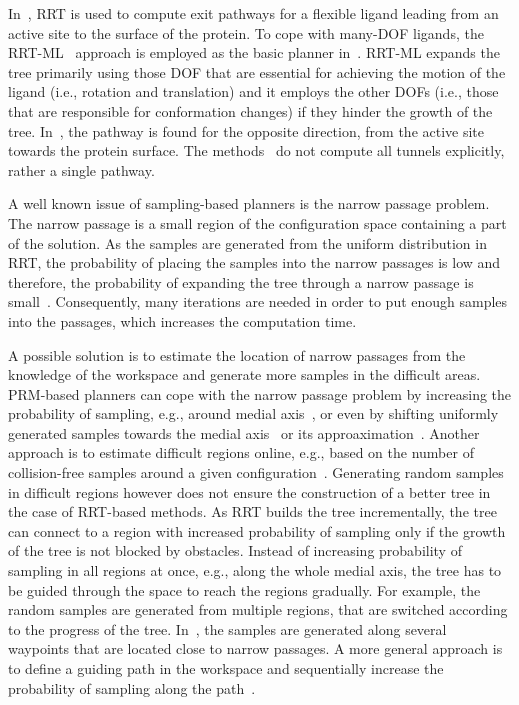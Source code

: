 \documentclass[usletter, 10pt, conference]{svjour3}      %
\begin{document}
In~\cite{guieysse2008structure,cortes2010simulating}, RRT is used to compute exit pathways for a flexible ligand leading from an active site to the surface of the protein.
To cope with many-DOF ligands, the RRT-ML~\cite{cortes2007mlrrt} approach is employed as the basic planner in~\cite{cortes2010simulating}.
RRT-ML expands the tree primarily using those DOF that are essential for achieving the motion of the ligand (i.e., rotation
and translation) and it employs the other DOFs (i.e., those that are responsible for conformation changes) if they hinder the growth of the tree.
In~\cite{cortesMD}, the pathway is found for the opposite direction, from the active site towards the protein surface.
The methods~\cite{guieysse2008structure,cortesMD} do not compute all tunnels explicitly, rather a single pathway.

A well known issue of sampling-based planners is the narrow passage problem.
The narrow passage is a small region of the configuration space containing a part of the solution.
As the samples are generated from the uniform distribution in RRT, the probability of placing the samples into the narrow passages is low and therefore, the probability of expanding the tree through a narrow passage is small~\cite{hannaWIS}.
Consequently, many iterations are needed in order to put enough samples into the passages, which increases the computation time.

A possible solution is to estimate the location of narrow passages from the knowledge of the workspace and generate more samples
in the difficult areas.
PRM-based planners can cope with the narrow passage problem by increasing the probability of sampling, e.g., around medial axis~\cite{amatoOBRRT,amato2002using,wilmarthMAPRM}, or even by shifting uniformly generated samples towards the medial axis~\cite{amatoOBPRM} or its approaximation~\cite{hollemanMAPRM}.
Another approach is to estimate difficult regions online, e.g., based on the number of collision-free samples around a given configuration~\cite{overmarsGauss,hsuBridge}.
Generating random samples in difficult regions however does not ensure the construction of a better tree in the case of RRT-based methods.
As RRT builds the tree incrementally, the tree can connect to a region with increased probability of sampling only if the growth of the tree is not blocked by obstacles.
Instead of increasing probability of sampling in all regions at once, e.g., along the whole medial axis, the tree has to be guided through the space to reach the regions gradually.
For example, the random samples are generated from multiple regions, that are switched according to the progress of the tree.
In~\cite{kardossRRTKK}, the samples are generated along several waypoints that are located close to narrow passages.
A more general approach is to define a guiding path in the workspace and sequentially increase the probability of sampling along the path~\cite{vonasek2009rrt,denny2014marrt,denny2016dynamic}.
\end{document}

